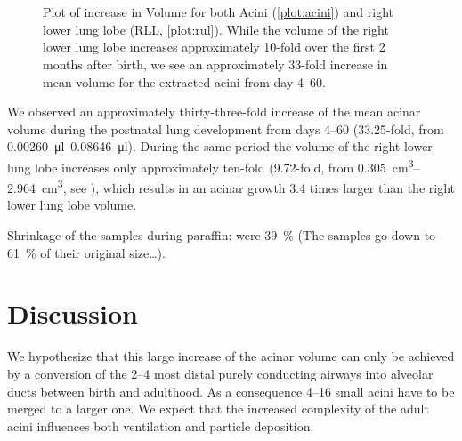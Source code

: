 \documentclass[%
	draft=false,
	paper=a4,%
	twoside=true,%
	draft=false,%
	abstract=false]{scrartcl}
\begin{document}
\begin{figure}
	\centering
	\pgfplotsset{width=.5\linewidth}
	\\%
	\\%
	\caption{Plot of increase in Volume for both Acini (\ref{plot:acini}) and right lower lung lobe (RLL, \ref{plot:rul}). While the volume of the right lower lung lobe increases approximately 10-fold over the first 2 months after birth, we see an approximately 33-fold increase in mean volume for the extracted acini from day \numrange{4}{60}.}
	\label{plot}
\end{figure}

We observed an approximately thirty-three-fold increase of the mean acinar volume during the postnatal lung development from days \numrange{4}{60} (33.25-fold, from \SIrange{0.00260}{0.08646}{\micro\litre}). During the same period the volume of the right lower lung lobe increases only approximately ten-fold (9.72-fold, from \SIrange{0.305}{2.964}{\centi\metre\cubed}, see \cite{Tschanz2003}), which results in an acinar growth 3.4 times larger than the right lower lung lobe volume.

Shrinkage of the samples during paraffin: were \SI{39}{\percent} (The samples go down to \SI{61}{\percent} of their original size\ldots).

\section{Discussion}\label{sec:Discussion}
We hypothesize that this large increase of the acinar volume can only be achieved by a conversion of the \numrange{2}{4} most distal purely conducting airways into alveolar ducts between birth and adulthood. As a consequence \numrange{4}{16} small acini have to be merged to a larger one. We expect that the increased complexity of the adult acini influences both ventilation and particle deposition.
\end{document}
